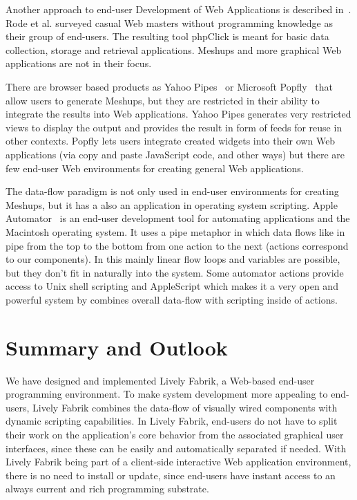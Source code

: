 \documentclass[pdftex, times, 10pt, twocolumn]{article}
\begin{document}
Another approach to end-user Development of Web Applications is described in~\cite{Rode2006EUD}. Rode et al. surveyed casual Web masters without programming knowledge as their group of end-users. The resulting tool phpClick is meant for basic data collection, storage and retrieval applications. Meshups and more graphical Web applications are not in their focus. 

There are browser based products as Yahoo Pipes~\cite{YahooPipes} or Microsoft Popfly~\cite{MicrosoftPopfly} that allow users to generate Meshups, but they are restricted in their ability to integrate the results into Web applications. Yahoo Pipes generates very restricted views to display the output and provides the result in form of feeds for reuse in other contexts. Popfly lets users integrate created widgets into their own Web applications (via copy and paste JavaScript code, and other ways) but there are few end-user Web environments for creating general Web applications. 

The data-flow paradigm is not only used in end-user environments for creating Meshups, but it has a also an application in operating system scripting. Apple Automator~\cite{AppleAutomator} is an end-user development tool for automating applications and the Macintosh operating system. It uses a pipe metaphor in which data flows like in pipe from the top to the bottom from one action to the next (actions correspond to our components). In this mainly linear flow loops and variables are possible, but they don't fit in naturally into the system. Some automator actions provide access to Unix shell scripting and AppleScript which makes it a very open and powerful system by combines overall data-flow with scripting inside of actions. 



\section{Summary and Outlook}
We have designed and implemented Lively Fabrik, a Web-based end-user programming environment. To make system development more appealing to end-users, Lively Fabrik combines the data-flow of visually wired components with dynamic scripting capabilities. In Lively Fabrik, end-users do not have to split their work on the application's core behavior from the associated graphical user interfaces, since these can be easily and automatically separated if needed. With Lively Fabrik being part of a client-side interactive Web application environment, there is no need to install or update, since end-users have instant access to an always current and rich programming substrate. 
\end{document}
